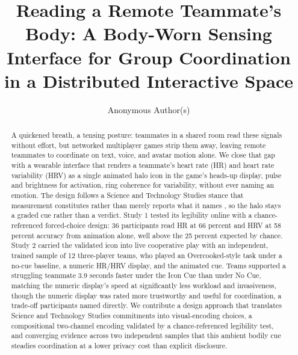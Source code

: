 \documentclass[manuscript,review,anonymous]{acmart}
\begin{document}
\title[Reading a Remote Teammate's Body]%
{Reading a Remote Teammate's Body: A Body-Worn Sensing Interface for Group Coordination in a Distributed Interactive Space}

\author{Anonymous Author(s)}



\renewcommand{\shortauthors}{Anonymous Author(s)}

\begin{abstract}
A quickened breath, a tensing posture: teammates in a shared room read these signals without effort, but networked multiplayer games strip them away, leaving remote teammates to coordinate on text, voice, and avatar motion alone. We close that gap with a wearable interface that renders a teammate's heart rate (HR) and heart rate variability (HRV) as a single animated halo icon in the game's heads-up display, pulse and brightness for activation, ring coherence for variability, without ever naming an emotion. The design follows a Science and Technology Studies stance that measurement constitutes rather than merely reports what it names \cite{barad_meeting_1996, bowker_sorting_2008, haraway_situated_1988}, so the halo stays a graded cue rather than a verdict. Study 1 tested its legibility online with a chance-referenced forced-choice design: 36 participants read HR at 66 percent and HRV at 58 percent accuracy from animation alone, well above the 25 percent expected by chance. Study 2 carried the validated icon into live cooperative play with an independent, trained sample of 12 three-player teams, who played an Overcooked-style task under a no-cue baseline, a numeric HR/HRV display, and the animated cue. Teams supported a struggling teammate 3.9 seconds faster under the Icon Cue than under No Cue, matching the numeric display's speed at significantly less workload and invasiveness, though the numeric display was rated more trustworthy and useful for coordination, a trade-off participants named directly. We contribute a design approach that translates Science and Technology Studies commitments into visual-encoding choices, a compositional two-channel encoding validated by a chance-referenced legibility test, and converging evidence across two independent samples that this ambient bodily cue steadies coordination at a lower privacy cost than explicit disclosure.
\end{abstract}
\end{document}
